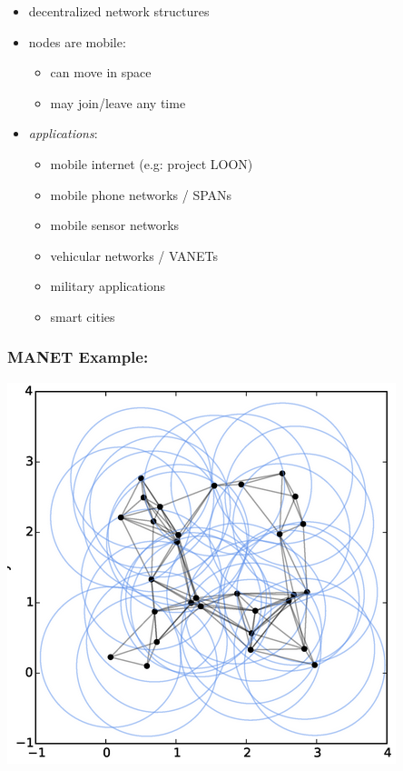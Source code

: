 \documentclass[11pt]{article}
\makeatletter
\def\maxwidth{\ifdim\Gin@nat@width>\linewidth\linewidth
    \else\Gin@nat@width\fi}
\providecommand{\tightlist}{%
      \setlength{\itemsep}{0pt}\setlength{\parskip}{0pt}}
\makeatother
\begin{document}
\begin{itemize}
\item
  decentralized network structures
\item
  nodes are mobile:

  \begin{itemize}
  \tightlist
  \item
    can move in space
  \item
    may join/leave any time
  \end{itemize}
\item
  \emph{applications}:

  \begin{itemize}
  \tightlist
  \item
    mobile internet (e.g: project LOON)
  \item
    mobile phone networks / SPANs
  \item
    mobile sensor networks
  \item
    vehicular networks / VANETs
  \item
    military applications
  \item
    smart cities
  \end{itemize}
\end{itemize}

    \hypertarget{example}{%
\subsubsection{MANET Example:}\label{example}}

\includegraphics[width=.8\maxwidth]{WANET2.png}
\end{document}
